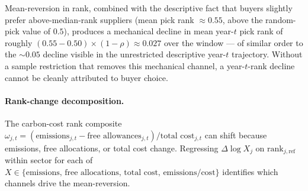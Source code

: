 Mean-reversion in rank, combined with the descriptive fact that buyers slightly prefer above-median-rank suppliers (mean pick rank $\approx 0.55$, above the random-pick value of $0.5$), produces a mechanical decline in mean year-$t$ pick rank of roughly $(0.55 - 0.50) \times (1 - \rho) \approx 0.027$ over the window --- of similar order to the $\sim 0.05$ decline visible in the unrestricted descriptive year-$t$ trajectory. Without a sample restriction that removes this mechanical channel, a year-$t$-rank decline cannot be cleanly attributed to buyer choice.

\paragraph{Rank-change decomposition.} The carbon-cost rank composite $\omega_{j,t} = (\text{emissions}_{j,t} - \text{free allowances}_{j,t}) / \text{total cost}_{j,t}$ can shift because emissions, free allocations, or total cost change. Regressing $\Delta \log X_j$ on $\text{rank}_{j, \text{ref}}$ within sector for each of $X \in \{\text{emissions, free allocations, total cost, emissions/cost}\}$ identifies which channels drive the mean-reversion.

